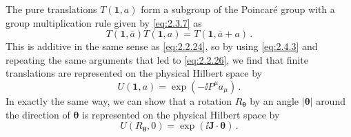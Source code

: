 The pure translations $T(\mathbf{1},a)$ form a subgroup of the Poincar\'e
group with a group multiplication rule given by \eqref{eq:2.3.7} as
\begin{equation}
T(\mathbf{1},\bar a)T(\mathbf{1},a)=T(\mathbf{1},\bar a+a)\,.
\tag{2.4.25}\label{eq:2.4.25}
\end{equation}
This is additive in the same sense as \eqref{eq:2.2.24}, so by using \eqref{eq:2.4.3} and
repeating the same arguments that led to \eqref{eq:2.2.26}, we find that finite
translations are represented on the physical Hilbert space by
\begin{equation}
U(\mathbf{1},a)=\exp(-\ii P^\mu a_\mu)\,.
\tag{2.4.26}\label{eq:2.4.26}
\end{equation}
In exactly the same way, we can show that a rotation $R_{\boldsymbol\theta}$ by
an angle $|\boldsymbol\theta|$ around the direction of $\boldsymbol\theta$ is
represented on the physical Hilbert space by
\begin{equation}
U(R_{\boldsymbol\theta},0)=\exp(\ii\mathbf{J}\cdot\boldsymbol\theta)\,.
\tag{2.4.27}\label{eq:2.4.27}
\end{equation}

